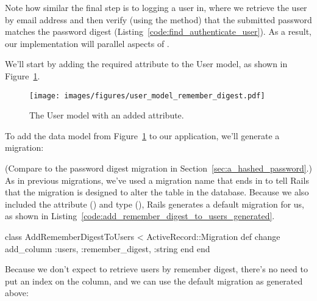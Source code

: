 \noindent Note how similar the final step is to logging a user in, where we retrieve the user by email address and then verify (using the  method) that the submitted password matches the password digest (Listing~\ref{code:find_authenticate_user}). As a result, our implementation will parallel aspects of .

We'll start by adding the required  attribute to the User model, as shown in Figure~\ref{fig:user_model_remember_digest}.

\begin{figure}
\begin{center}
\texttt{[image: images/figures/user\_model\_remember\_digest.pdf]}
\end{center}
\caption{The User model with an added  attribute.\label{fig:user_model_remember_digest}}
\end{figure}

\noindent To add the data model from Figure~\ref{fig:user_model_remember_digest} to our application, we'll generate a migration:


\noindent (Compare to the password digest migration in Section~\ref{sec:a_hashed_password}.) As in previous migrations, we've used a migration name that ends in  to tell Rails that the migration is designed to alter the  table in the database. Because we also included the attribute () and type (), Rails generates a default migration for us, as shown in Listing~\ref{code:add_remember_digest_to_users_generated}.

\begin{codelisting}
\label{code:add_remember_digest_to_users_generated}
\begin{code}
class AddRememberDigestToUsers < ActiveRecord::Migration
  def change
    add_column :users, :remember_digest, :string
  end
end
\end{code}
\end{codelisting}

Because we don't expect to retrieve users by remember digest, there's no need to put an index on the  column, and we can use the default migration as generated above:

